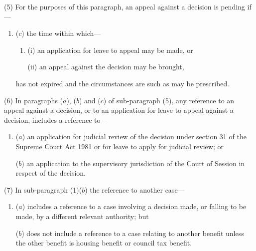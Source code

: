 \documentclass[12pt,a4paper]{article}
\begin{document}
%

(5) For the purposes of this paragraph, an appeal against a decision is pending if—
\begin{enumerate}\item[]
%

($c$) the time within which—
\begin{enumerate}\item[]
(i) an application for leave to appeal may be made, or

(ii) an appeal against the decision may be brought,
\end{enumerate}
has not expired and the circumstances are such as may be prescribed.
\end{enumerate}

(6) In paragraphs ($a$), ($b$)  and ($c$)  of sub-paragraph (5), any reference to an appeal against a decision, or to an application for leave to appeal against a decision, includes a reference to—
\begin{enumerate}\item[]
($a$) an application for judicial review of the decision under section 31 of the Supreme Court Act 1981 or for leave to apply for judicial review; or

($b$) an application to the supervisory jurisdiction of the Court of Session in respect of the decision.
\end{enumerate}

(7) In sub-paragraph (1)($b$)  the reference to another case—
\begin{enumerate}\item[]
($a$) includes a reference to a case involving a decision made, or falling to be made, by a different relevant authority; but

($b$) does not include a reference to a case relating to another benefit unless the other benefit is housing benefit or council tax benefit.
\end{enumerate}
\end{document}
